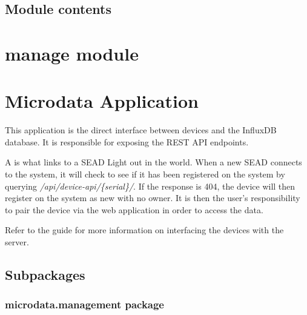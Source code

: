 \documentclass[letterpaper,10pt,english]{sphinxmanual}
\begin{document}

\begin{fulllineitems}
\label{modules/home:home.views.signout}
\end{fulllineitems}



\subsection{Module contents}
\label{modules/home:module-contents}\label{modules/home:module-home}

\section{manage module}
\label{modules/manage:manage-module}\label{modules/manage::doc}\label{modules/manage:module-manage}

\section{Microdata Application}
\label{modules/microdata:microdata-application}\label{modules/microdata::doc}
This application is the direct interface between devices and the InfluxDB database. It is responsible for exposing the REST API endpoints.

A {\hyperref[modules/microdata:microdata.models.Device]{\emph{}}} is what links to a SEAD Light out in the world. When a new SEAD connects to the system, it will check to see
if it has been registered on the system by querying \emph{/api/device-api/\{serial\}/}. If the response is 404, the device will then register
on the system as new with no owner. It is then the user's responsibility to pair the device via the web application in order to access
the data.

Refer to the {\hyperref[getting-started:getting-started]{\emph{}}} guide for more information on interfacing the devices with the server.


\subsection{Subpackages}
\label{modules/microdata:subpackages}

\subsubsection{microdata.management package}
\label{modules/microdata.management:microdata-management-package}\label{modules/microdata.management::doc}
\end{document}
